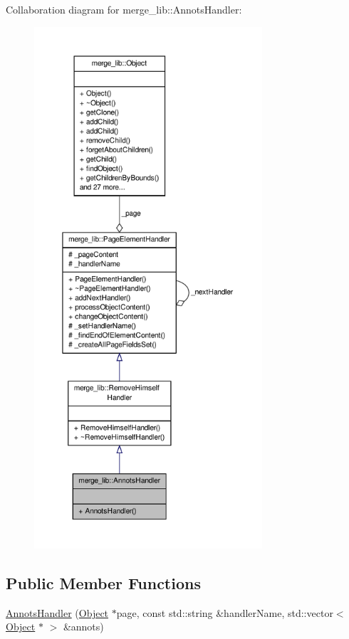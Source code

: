 Collaboration diagram for merge\-\_\-lib\-:\-:Annots\-Handler\-:
\nopagebreak
\begin{figure}[H]
\begin{center}
\leavevmode
\includegraphics[height=550pt]{d7/d67/classmerge__lib_1_1_annots_handler__coll__graph}
\end{center}
\end{figure}
\subsection*{Public Member Functions}
\begin{DoxyCompactItemize}
\item 
\hyperlink{classmerge__lib_1_1_annots_handler_a036ac1dfad9aad5ea7af2dabee932096}{Annots\-Handler} (\hyperlink{classmerge__lib_1_1_object}{Object} $\ast$page, const std\-::string \&handler\-Name, std\-::vector$<$ \hyperlink{classmerge__lib_1_1_object}{Object} $\ast$ $>$ \&annots)
\end{DoxyCompactItemize}
